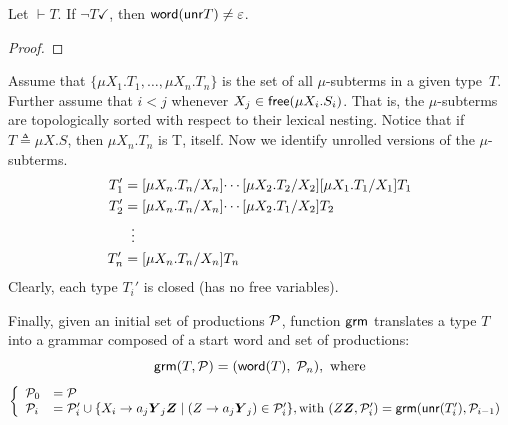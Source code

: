 \begin{lemma}
\label{lemma:non_terminated_word}
	Let $\vdash T$. If $\neg T \checkmark$, then $\mathsf{word}(\mathsf{unr} T) \neq \varepsilon$.
\end{lemma}
\begin{proof}
\end{proof}



Assume that $\{\mu X_1.T_1,\dots,\mu X_n.T_n\}$ is the set of all
$\mu$-subterms in a given type~$T$. Further assume that $i<j$ whenever
$X_j \in \mathsf{free}(\mu X_i.S_i)$. That is, the $\mu$-subterms are
topologically sorted with respect to their lexical nesting.
%
Notice that if $T \triangleq \mu X. S$, then $\mu X_n. T_n$
is T, itself.
Now we identify unrolled versions of the $\mu$-subterms. 
%
\begin{align*}
  T_1' &= [{\mu X_n.T_n}/{X_n}]{ \cdots [{\mu X_2.T_2}/{X_2}][{\mu X_1.T_1}/{X_1}]{T_1} }\\
  T_2' &= [{\mu X_n.T_n}/{X_n}]{ \cdots [{\mu X_2.T_1}/{X_2}]{T_2} }\\
       &\;\;\vdots \\
  T_n' &= [{\mu X_n.T_n}/{X_n}]{T_n} 
\end{align*}
%
Clearly, each type $T_i'$ is closed (has no free variables).\smallskip

Finally, given an initial set of productions $\mathcal P$, function
$\mathsf{grm}$ translates a type $T$ into a grammar composed of a start word
and set of productions:
%
\begin{equation*}
  \mathsf{grm}(T,\mathcal P) = (\mathsf{word}(T),\; \mathcal P_n), \text{ where} \\
\end{equation*}
\[
  \left\{
  \begin{array}{lll}
  	\productions_{0} &= \productions\\
  	\productions_i &= \productions_i' \cup \{X_i \rightarrow a_j\vec Y_j \vec Z \mid (Z \rightarrow a_j \vec Y_j)\in \productions_i'\}, \text{with }(Z \vec Z, \productions_i')=\grm(\Unravel(T_i'), \productions_{i-1})
  \end{array}\right.\\\\
\]

